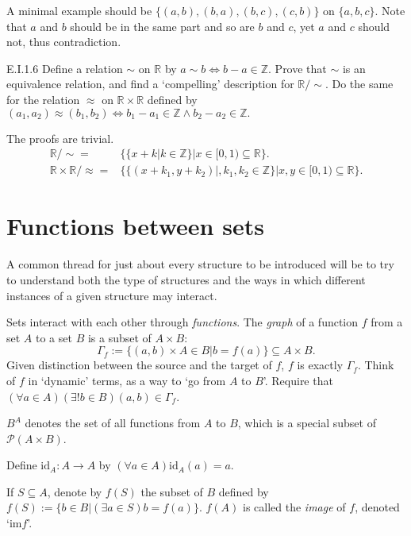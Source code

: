 A minimal example should be $\{(a,b),(b,a),(b,c),(c,b)\}$ on $\{a,b,c\}$. Note that $a$ and $b$ should be in the same part and so are $b$ and $c$, yet $a$ and $c$ should not, thus contradiction.

\begin{exercise}{E.I.1.6}
  Define a relation $\sim$ on $\mathbb{R}$ by $a\sim b \Leftrightarrow b-a\in\mathbb{Z}$. Prove that $\sim$ is an equivalence relation, and find a `compelling' description for $\mathbb{R}/\sim$. Do the same for the relation $\approx$ on $\mathbb{R}\times\mathbb{R}$ defined by $(a_1, a_2)\approx(b_1, b_2)\Leftrightarrow b_1-a_1\in\mathbb{Z}\wedge b_2-a_2\in\mathbb{Z}.$
\end{exercise}

The proofs are trivial.
\begin{align*}
  \mathbb{R}/\sim=                     & \{\{x+k|k\in \mathbb{Z}\}|x\in[0,1)\subseteq\mathbb{R}\}.                      \\
  \mathbb{R}\times \mathbb{R}/\approx= & \{\{(x+k_1,y+k_2)|, k_1,k_2\in \mathbb{Z}\}|x,y\in[0,1)\subseteq \mathbb{R}\}.
\end{align*}

\section{Functions between sets}

A common thread for just about every structure to be introduced will be to try to understand both the type of structures and the ways in which diﬀerent instances of a given structure may interact.

Sets interact with each other through \textit{functions}. The \textit{graph} of a function $f$ from a set $A$ to a set $B$ is a subset of $A\times B$:
\[
  \Gamma_f:=\{(a,b)\times A\in B|b=f(a)\}\subseteq A\times B.
\]
Given distinction between the source and the target of $f$, $f$ is exactly $\Gamma_f$. Think of $f$ in `dynamic' terms, as a way to `go from $A$ to $B$'. Require that $(\forall a\in A)(\exists !b\in B)(a,b)\in \Gamma_f$.

$B^A$ denotes the set of all functions from $A$ to $B$, which is a special subset of $\mathcal{P}(A\times B)$.

Define $\mathrm{id}_A:A\rightarrow A$ by $(\forall a\in A)\mathrm{id}_A(a)=a$.

If $S\subseteq A$, denote by $f(S)$ the subset of $B$ defined by $f(S):=\{b\in B|(\exists a\in S)b=f(a)\}$. $f(A)$ is called the \textit{image} of $f$, denoted `$\mathrm{im}f$'.

